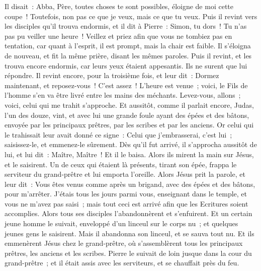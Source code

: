 \begin{multicols}{2}
Il disait~: Abba, Père, toutes choses te sont possibles, éloigne de moi cette coupe~! Toutefois, non pas ce que je veux, mais ce que tu veux.
Puis il revint vers les disciples qu'il trouva endormis, et il dit à Pierre~: Simon, tu dors~! Tu n'as pas pu veiller une heure~!
Veillez et priez afin que vous ne tombiez pas en tentation, car quant à l'esprit, il est prompt, mais la chair est faible.
Il s'éloigna de nouveau, et fit la même prière, disant les mêmes paroles.
Puis il revint, et les trouva encore endormis, car leurs yeux étaient appesantis. Ils ne surent que lui répondre.
Il revint encore, pour la troisième fois, et leur dit~: Dormez maintenant, et reposez-vous~! C'est assez~! L'heure est venue~; voici, le Fils de l'homme s'en va être livré entre les mains des méchants.
Levez-vous, allons~; voici, celui qui me trahit s'approche.
Et aussitôt, comme il parlait encore, Judas, l'un des douze, vint, et avec lui une grande foule ayant des épées et des bâtons, envoyée par les principaux prêtres, par les scribes et par les anciens.
Or celui qui le trahissait leur avait donné ce signe~: Celui que j'embrasserai, c'est lui~; saisissez-le, et emmenez-le sûrement.
Dès qu'il fut arrivé, il s'approcha aussitôt de lui, et lui dit~: Maître, Maître~! Et il le baisa.
Alors ils mirent la main sur Jésus, et le saisirent.
Un de ceux qui étaient là présents, tirant son épée, frappa le serviteur du grand-prêtre et lui emporta l'oreille.
Alors Jésus prit la parole, et leur dit~: Vous êtes venus comme après un brigand, avec des épées et des bâtons, pour m'arrêter.
J'étais tous les jours parmi vous, enseignant dans le temple, et vous ne m'avez pas saisi~; mais tout ceci est arrivé afin que les Ecritures soient accomplies.
Alors tous ses disciples l'abandonnèrent et s'enfuirent.
Et un certain jeune homme le suivait, enveloppé d'un linceul sur le corps nu~; et quelques jeunes gens le saisirent.
Mais il abandonna son linceul, et se sauva tout nu.
Et ils emmenèrent Jésus chez le grand-prêtre, où s'assemblèrent tous les principaux prêtres, les anciens et les scribes.
Pierre le suivait de loin jusque dans la cour du grand-prêtre~; et il était assis avec les serviteurs, et se chauffait près du feu.

\end{multicols}

